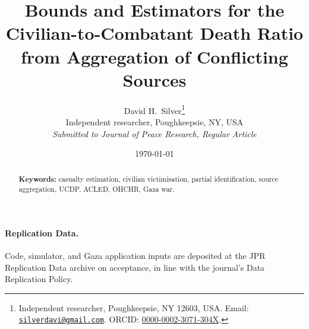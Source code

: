 \documentclass[12pt,a4paper]{article}
\title{\textbf{Bounds and Estimators for the Civilian-to-Combatant Death Ratio\\ from Aggregation of Conflicting Sources}}
\author{David H.\ Silver\thanks{Independent researcher, Poughkeepsie, NY 12603, USA. Email: \href{mailto:silverdavi@gmail.com}{\texttt{silverdavi@gmail.com}}. ORCID: \href{https://orcid.org/0000-0002-3071-304X}{0000-0002-3071-304X}.}\\
  \small Independent researcher, Poughkeepsie, NY, USA\\[2pt]
  \small\emph{Submitted to Journal of Peace Research, Regular Article}}
\date{\today}
\theoremstyle{plain}
\theoremstyle{definition}
\theoremstyle{remark}
\begin{document}
\maketitle

\begin{abstract}


\bigskip
\noindent\textbf{Keywords:} casualty estimation, civilian victimisation, partial identification, source aggregation, UCDP, ACLED, OHCHR, Gaza war.
\end{abstract}










\paragraph{Replication Data.} Code, simulator, and Gaza application inputs are deposited at the JPR Replication Data archive on acceptance, in line with the journal's Data Replication Policy.


\end{document}
